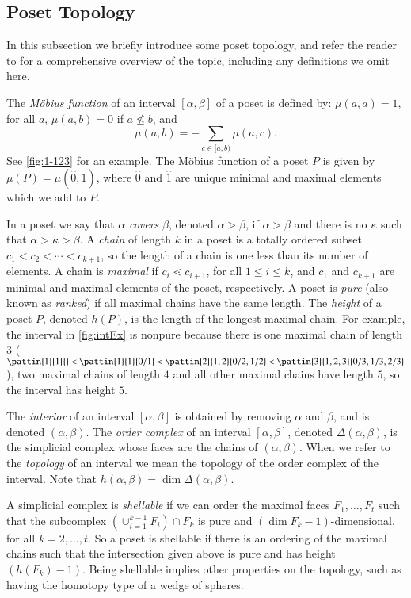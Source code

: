 \documentclass[preprint,11pt]{elsarticle}
\newcommand\h{h}
\numberwithin{equation}{section}
\numberwithin{figure}{section}
\numberwithin{thm}{section}
\begin{document}
\subsection{Poset Topology}
In this subsection we briefly introduce some poset topology, and refer the reader to \cite{Wac07}
for a comprehensive overview of the topic, including any definitions we omit here.

The \emph{M\"obius function} of an interval $[\alpha,\beta]$ of a poset is defined by:\linebreak
${\mu(a,a)=1}$, for all $a$, $\mu(a,b)=0$ if $a\not\le b$, and $$\mu(a,b)=-\sum_{c\in[a,b)}\mu(a,c).$$
See \cref{fig:1-123} for an example. The M\"obius function of a poset $P$ is given by $\mu(P)=\mu(\hat{0},\hat{1})$, where $\hat{0}$ and $\hat{1}$ are unique minimal and maximal elements which we add to $P$. 

In a poset we say that $\alpha$ \emph{covers} $\beta$, denoted $\alpha\gtrdot\beta$, if $\alpha>\beta$
and there is no $\kappa$ such that $\alpha>\kappa>\beta$. A \emph{chain} of length $k$ in a poset is
a totally ordered subset $c_1<c_2<\cdots<c_{k+1}$, so the length of a chain is one less
than its number of elements. A chain is \emph{maximal} if $c_i\lessdot c_{i+1}$,
for all $1\le i \le k$, and $c_1$ and $c_{k+1}$ are minimal and maximal elements of the poset, respectively.
A poset is \emph{pure} (also known as \emph{ranked}) if all
maximal chains have the same length. The \emph{height} of a poset $P$, denoted $\h(P)$, is the
length of the longest maximal chain. For example, the interval in \cref{fig:intEx} is nonpure because
there is one maximal chain of length $3$ ($\pattin{1}{1}{}\lessdot\pattin{1}{1}{0/1}\lessdot
\pattin{2}{1,2}{0/2,1/2}\lessdot\pattin{3}{1,2,3}{0/3,1/3,2/3}$), two maximal chains of length $4$
and all other maximal chains have length $5$, so the interval has height $5$.

The \emph{interior} of an interval $[\alpha,\beta]$ is obtained by removing $\alpha$ and $\beta$,
and is denoted $(\alpha,\beta)$. The \emph{order complex} of an interval $[\alpha,\beta]$, denoted
$\Delta(\alpha,\beta)$, is the simplicial complex whose faces are the chains of $(\alpha,\beta)$.
When we refer to the \emph{topology} of an interval we mean the topology of the order complex of the interval.
Note that $\h(\alpha,\beta)=\dim\Delta(\alpha,\beta)$.

A simplicial complex is \emph{shellable} if we can order the maximal faces $F_1,\ldots,F_t$
such that the subcomplex $\left(\cup_{i=1}^{k-1}F_i\right)\cap F_k$ is pure and
$(\dim F_k-1)$-dimensional, for all $k=2,\ldots,t$. So a poset is shellable if
there is an ordering of the maximal chains such that the intersection given above is pure and has height 
$(\h(F_k)-1)$. Being shellable implies other properties
on the topology, such as having the homotopy type of a wedge of spheres.
\end{document}
